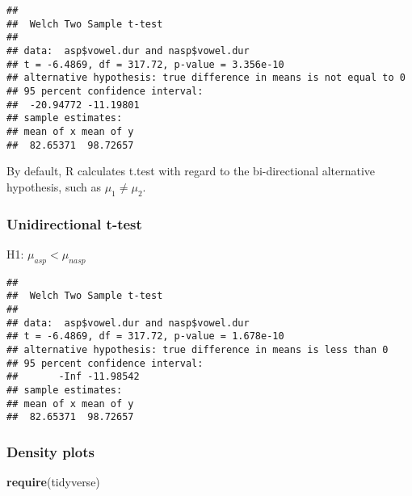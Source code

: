 \documentclass[]{article}
\newenvironment{Shaded}{\begin{snugshade}}{\end{snugshade}}
\newcommand{\KeywordTok}[1]{\textcolor[rgb]{0.13,0.29,0.53}{\textbf{#1}}}
\newcommand{\DataTypeTok}[1]{\textcolor[rgb]{0.13,0.29,0.53}{#1}}
\newcommand{\StringTok}[1]{\textcolor[rgb]{0.31,0.60,0.02}{#1}}
\newcommand{\OperatorTok}[1]{\textcolor[rgb]{0.81,0.36,0.00}{\textbf{#1}}}
\newcommand{\NormalTok}[1]{#1}
\begin{document}
\begin{Shaded}
\end{Shaded}

\begin{verbatim}
## 
##  Welch Two Sample t-test
## 
## data:  asp$vowel.dur and nasp$vowel.dur
## t = -6.4869, df = 317.72, p-value = 3.356e-10
## alternative hypothesis: true difference in means is not equal to 0
## 95 percent confidence interval:
##  -20.94772 -11.19801
## sample estimates:
## mean of x mean of y 
##  82.65371  98.72657
\end{verbatim}

By default, R calculates t.test with regard to the bi-directional
alternative hypothesis, such as \(\mu_1 \neq \mu_2\).

\subsubsection{Unidirectional t-test}\label{unidirectional-t-test}

H1: \(\mu_{asp} \lt \mu_{nasp}\)

\begin{Shaded}
\end{Shaded}

\begin{verbatim}
## 
##  Welch Two Sample t-test
## 
## data:  asp$vowel.dur and nasp$vowel.dur
## t = -6.4869, df = 317.72, p-value = 1.678e-10
## alternative hypothesis: true difference in means is less than 0
## 95 percent confidence interval:
##       -Inf -11.98542
## sample estimates:
## mean of x mean of y 
##  82.65371  98.72657
\end{verbatim}

\subsubsection{Density plots}\label{density-plots}

\begin{Shaded}
\begin{Highlighting}[]
\KeywordTok{require}\NormalTok{(tidyverse)}
\end{Highlighting}
\end{Shaded}
\end{document}
